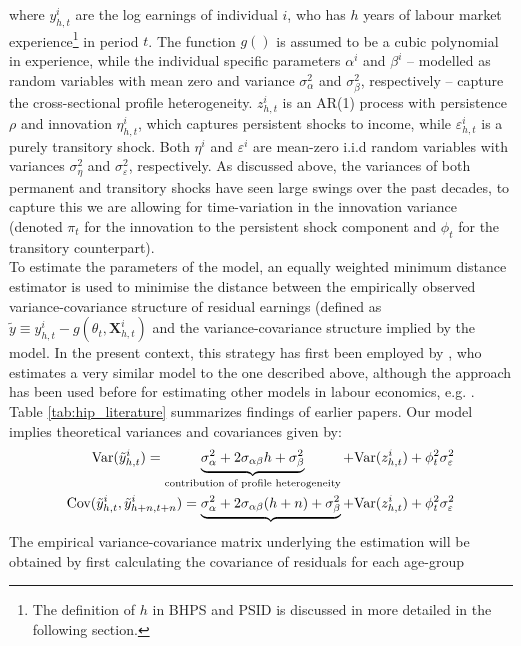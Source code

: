 where $y_{h,t}^i$ are the log earnings of individual $i$, who has $h$ years of
labour market experience\footnote{The definition of $h$ in BHPS and PSID is 
discussed in more detailed in the following section.}
 in period $t$. The function $g()$ is assumed to be
a cubic polynomial in experience, while the individual specific parameters
$\alpha^i$ and $\beta^i$ -- modelled as random variables with mean zero and
variance $\sigma^2_{\alpha}$ and $\sigma^2_{\beta}$, respectively --
 capture the cross-sectional profile heterogeneity.
$z_{h,t}^i$ is an AR(1) process with persistence $\rho$ and innovation 
$\eta_{h,t}^i$, which captures persistent shocks to income, while
$\varepsilon_{h,t}^i$ is a purely transitory shock. Both $\eta^i$ and
$\varepsilon^i$ are mean-zero i.i.d random variables with variances
$\sigma^2_{\eta}$ and $\sigma^2_{\varepsilon}$, respectively. As discussed
above, the variances of both permanent and transitory shocks have seen large
swings over the past decades, to capture this we are allowing for time-variation
in the innovation variance (denoted $\pi_t$ for the innovation to the persistent
shock component and $\phi_t$ for the transitory counterpart). \\
To estimate the parameters of the model, an equally weighted minimum distance
estimator is used to minimise the distance between the empirically observed
variance-covariance structure of residual earnings (defined as $\tilde{y} \equiv
y_{h,t}^i - g(\theta_t, \pmb{X}_{h,t}^i)$ and the variance-covariance
structure implied by the model. In the present context, this strategy has first
been employed by \citet{Baker1997}, who estimates a very similar model to the one
 described above, although the approach has been used before for estimating
other models in labour economics, e.g. \citet{AbowdCard89}. Table 
\ref{tab:hip_literature} summarizes findings of earlier papers. Our model implies
theoretical variances and covariances given by:
\begin{align}
\mbox{Var}(\tilde{y}_{h,t}^i) = \underbrace{\sigma^2_{\alpha} + 2 \sigma_{\alpha \beta} h + \sigma^2_{\beta}}_{\text{contribution of profile heterogeneity}} + \mbox{Var}(z^i_{h,t}) + \phi_t^2 \sigma^2_{\varepsilon} \\
\mbox{Cov}(\tilde{y}_{h,t}^i, \tilde{y}_{h+n,t+n}^i) = \underbrace{\sigma^2_{\alpha} + 2 \sigma_{\alpha \beta} (h+n) + \sigma^2_{\beta}} + \mbox{Var}(z^i_{h,t}) + \phi_t^2 \sigma^2_{\varepsilon}
\end{align}
The empirical variance-covariance matrix underlying the estimation will be
obtained by first calculating the covariance of residuals for each age-group
